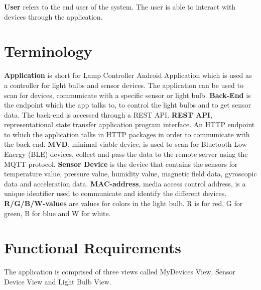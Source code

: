 \documentclass[a4paper]{article}
\begin{document}
\textbf{User} refers to the end user of the system. The user is able to interact with devices through the application. 

\section{Terminology}

\textbf{Application} is short for Lamp Controller Android Application which is used as a controller for light bulbs and sensor devices. The application can be used to scan for devices, communicate with a specific sensor or light bulb. 
\newline \newline
\textbf{Back-End} is the endpoint which the app talks to, to control the light bulbs and to get sensor data. The back-end is accessed through a REST API. 
\newline \newline
\textbf{REST API}, representational state transfer application program interface. An HTTP endpoint to which the application talks in HTTP packages in order to communicate with the back-end. 
\newline \newline
\textbf{MVD}, minimal viable device, is used to scan for Bluetooth Low Energy (BLE) devices, collect and pass the data to the remote server using the MQTT protocol.
\newline \newline
\textbf{Sensor Device} is the device that contains the sensors for temperature value, pressure value, humidity value, magnetic field data, gyroscopic data and acceleration data.
\newline \newline
\textbf{MAC-address}, media access control address, is a unique identifier used to communicate and identify the different devices.
\newline \newline
\textbf{R/G/B/W-values} are values for colors in the light bulb. R is for red, G for green, B for blue and W for white.
\section{Functional Requirements}

The application is comprised of three views called MyDevices View, Sensor Device View and Light Bulb View. 
\end{document}
